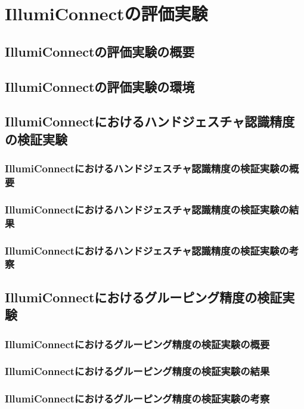 \chapter{IllumiConnectの評価実験}
\section{IllumiConnectの評価実験の概要}
\section{IllumiConnectの評価実験の環境}
\section{IllumiConnectにおけるハンドジェスチャ認識精度の検証実験}
\subsection*{IllumiConnectにおけるハンドジェスチャ認識精度の検証実験の概要}
\subsection*{IllumiConnectにおけるハンドジェスチャ認識精度の検証実験の結果}
\subsection*{IllumiConnectにおけるハンドジェスチャ認識精度の検証実験の考察}
\section{IllumiConnectにおけるグルーピング精度の検証実験}
\subsection*{IllumiConnectにおけるグルーピング精度の検証実験の概要}
\subsection*{IllumiConnectにおけるグルーピング精度の検証実験の結果}
\subsection*{IllumiConnectにおけるグルーピング精度の検証実験の考察}
